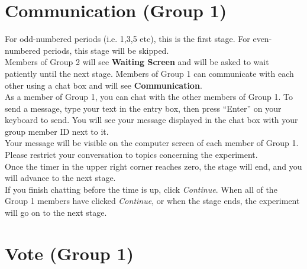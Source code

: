 \documentclass[12pt]{article}
\begin{document}
\section{Communication (Group 1)}


For odd-numbered periods (i.e. 1,3,5 etc), this is the first stage. For even-numbered periods, this stage will be skipped.\\ 

Members of Group 2 will see {\bf Waiting Screen} and will be asked to wait patiently until the next stage. Members of Group 1 can communicate with each other using a chat box and will see {\bf Communication}.\\  

As a member of Group 1, you can chat with the other members of Group 1.  To send a message, type your text in the entry box, then press ``Enter'' on your keyboard to send.  You will see your message displayed in the chat box with your group member ID next to it.\\ 

Your message will be visible on the computer screen of each member of Group 1. Please restrict your conversation to topics concerning the experiment.\\  

Once the timer in the upper right corner reaches zero, the stage will end, and you will advance to the next stage.\\

If you finish chatting before the time is up, click {\em Continue}. When all of the Group 1 members have clicked {\em Continue}, or when the stage ends, the experiment will go on to the next stage.\\  





\iffalse

\section{Vote (Group 1)}
\end{document}

